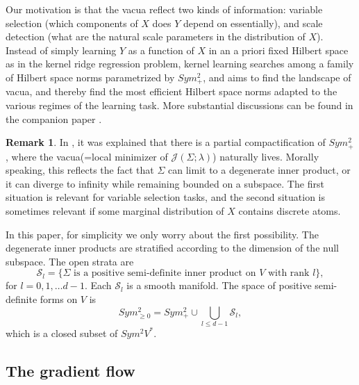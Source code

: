 \documentclass[a4paper]{article}
\theoremstyle{definition}
\newtheorem{rmk}{Remark}
\newcommand{\1}{\mathbbm{1}}
\begin{document}
	
	
	
	Our motivation is that the vacua  reflect two kinds of information: variable selection (which components of $X$ does $Y$ depend on essentially), and scale detection (what are the natural scale parameters in the distribution of $X$).  Instead of simply learning $Y$ as a function of $X$ in an a priori fixed Hilbert space as in the kernel ridge regression problem, kernel learning searches among a family of Hilbert space norms parametrized by $Sym^2_+$, and aims to 
	find the landscape of vacua, and thereby find the most efficient Hilbert space norms adapted to the various regimes of the learning task. More substantial discussions can be found in the companion paper \cite{RuanLi}.
	
	
	
	\begin{rmk}\label{rmk:partialcompactification}
		In \cite{RuanLi}, it was explained that there is a partial compactification of $Sym^2_+$, where the vacua(=local minimizer of $\mathcal{J}(\Sigma; \lambda)$) naturally lives. Morally speaking, this reflects the fact that $\Sigma$ can limit to a degenerate inner product, or it can diverge to infinity while remaining bounded on a subspace. The first situation is relevant for variable selection tasks, and the second situation is sometimes relevant if some marginal distribution of $X$ contains discrete atoms.
		
		
		
		In this paper, for simplicity we only worry about the first possibility. 
		The degenerate inner products are stratified according to the dimension of the null subspace. The open strata are
		\[
		\mathcal{S}_l= \{  \Sigma \text{ is a positive semi-definite inner product on $V$ with rank $l$} \},
		\]
		for $l=0,1,\ldots d-1.$
		Each $\mathcal{S}_l$ is a smooth manifold. The space of positive semi-definite forms on $V$ is
		\begin{equation*}
			Sym^2_{\geq 0}= Sym^2_+\cup \bigcup_{l\leq d-1} \mathcal{S}_l ,
		\end{equation*}
		which is a closed subset of $Sym^2 V^*$. 
	\end{rmk}
	
	
	
	
	
	
	
	\subsection{The gradient flow}
	
\end{document}
